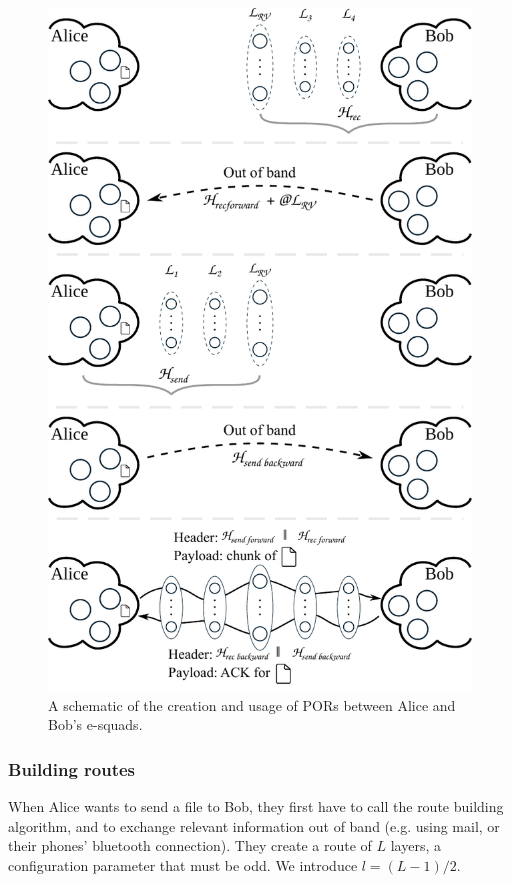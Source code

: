 \begin{figure}[t]
  \includegraphics[width=\linewidth]{figures/file_exchange.pdf}
  \caption{\label{fig:file-exchange}A schematic of the creation and usage of PORs between Alice and Bob's e-squads.}
\end{figure}

\subsubsection{Building routes} 
\label{ssub:building_routes}


When Alice wants to send a file to Bob, they first have to call the route building algorithm, and to exchange relevant information out of band (e.g. using mail, or their phones' bluetooth connection).
They create a route of $L$ layers, a configuration parameter that must be odd. We introduce $l=(L-1)/2$.

